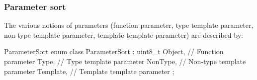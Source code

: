 

\subsubsection{Parameter sort}
\label{sec:ifc-parameter-sort}

The various notions of parameters (function parameter, type template parameter, non-type template parameter, template template parameter) are described by:
\begin{typedef}{ParameterSort}{}
	enum class ParameterSort : uint8_t {
		Object,					// Function parameter
		Type,						// Type template parameter
		NonType,					// Non-type template parameter
		Template,					// Template template parameter
	};
\end{typedef}

\subsection{} 
\label{sec:ifc:DeclSort:Field}

